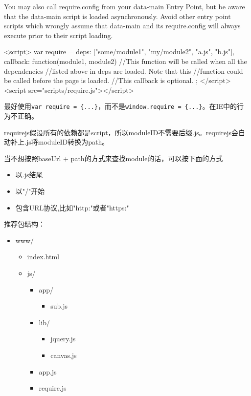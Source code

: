 You may also call require.config from your data-main Entry Point, but be aware that the data-main script is loaded asynchronously. Avoid other entry point scripts which wrongly assume that data-main and its require.config will always execute prior to their script loading.


\begin{HTML5}
<script>
    var require = {
        deps: ["some/module1", "my/module2", "a.js", "b.js"],
        callback: function(module1, module2) {
            //This function will be called when all the dependencies
            //listed above in deps are loaded. Note that this
            //function could be called before the page is loaded.
            //This callback is optional.
        }
    };
</script>
<script src="scripts/require.js"></script>
\end{HTML5}

最好使用\lstinline$var require = {...}$，而不是\lstinline$window.require = {...}$。在IE中的行为不正确。


requirejs假设所有的依赖都是script，所以moduleID不需要后缀.js。requirejs会自动补上.js将moduleID转换为path。

当不想按照baseUrl + path的方式来查找module的话，可以按下面的方式
\begin{itemize}
\item 以.js结尾
\item 以"/"开始
\item 包含URL协议,比如"http:"或者"https:"
\end{itemize}

推荐包结构：
\begin{itemize}
\item www/
	\begin{itemize}
	\item index.html
	\item js/
		\begin{itemize}
		\item app/
			\begin{itemize}
			\item sub.js
			\end{itemize}
		\item lib/
			\begin{itemize}
			\item jquery.js
			\item canvas.js
			\end{itemize}	
		\item app.js
		\item require.js						
		\end{itemize}
	\end{itemize}
\end{itemize}


